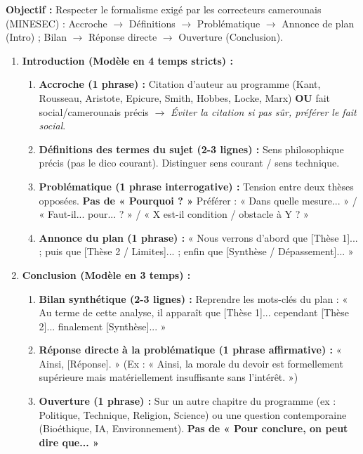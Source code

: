 \documentclass[11pt]{article}
\begin{document}
\begin{methode}
\textbf{Objectif :} Respecter le formalisme exigé par les correcteurs camerounais (MINESEC) : Accroche $\rightarrow$ Définitions $\rightarrow$ Problématique $\rightarrow$ Annonce de plan (Intro) ; Bilan $\rightarrow$ Réponse directe $\rightarrow$ Ouverture (Conclusion).
\begin{enumerate}
    \item \textbf{Introduction (Modèle en 4 temps stricts) :}
    \begin{enumerate}
        \item \textbf{Accroche (1 phrase) :} Citation d'auteur au programme (Kant, Rousseau, Aristote, Epicure, Smith, Hobbes, Locke, Marx) \textbf{OU} fait social/camerounais précis $\rightarrow$ \emph{Éviter la citation si pas sûr, préférer le fait social}.
        \item \textbf{Définitions des termes du sujet (2-3 lignes) :} Sens philosophique précis (pas le dico courant). Distinguer sens courant / sens technique.
        \item \textbf{Problématique (1 phrase interrogative) :} Tension entre deux thèses opposées. \textbf{Pas de « Pourquoi ? »} Préférer : « Dans quelle mesure... » / « Faut-il... pour... ? » / « X est-il condition / obstacle à Y ? »
        \item \textbf{Annonce du plan (1 phrase) :} « Nous verrons d'abord que [Thèse 1]... ; puis que [Thèse 2 / Limites]... ; enfin que [Synthèse / Dépassement]... »
    \end{enumerate}
    \item \textbf{Conclusion (Modèle en 3 temps) :}
    \begin{enumerate}
        \item \textbf{Bilan synthétique (2-3 lignes) :} Reprendre les mots-clés du plan : « Au terme de cette analyse, il apparaît que [Thèse 1]... cependant [Thèse 2]... finalement [Synthèse]... »
        \item \textbf{Réponse directe à la problématique (1 phrase affirmative) :} « Ainsi, [Réponse]. » (Ex : « Ainsi, la morale du devoir est formellement supérieure mais matériellement insuffisante sans l'intérêt. »)
        \item \textbf{Ouverture (1 phrase) :} Sur un autre chapitre du programme (ex : Politique, Technique, Religion, Science) ou une question contemporaine (Bioéthique, IA, Environnement). \textbf{Pas de « Pour conclure, on peut dire que... »}
    \end{enumerate}
\end{enumerate}
\end{methode}
\end{document}
